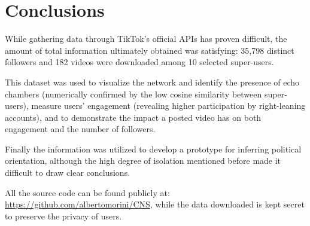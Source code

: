 \section{Conclusions}

While gathering data through TikTok's official APIs has proven difficult, the amount of total information ultimately obtained was satisfying: 35,798 distinct followers and 182 videos were downloaded among 10 selected super-users.

This dataset was used to visualize the network and identify the presence of echo chambers (numerically confirmed by the low cosine similarity between super-users), measure users' engagement (revealing higher participation by right-leaning accounts), and to demonstrate the impact a posted video has on both engagement and the number of followers.

Finally the information was utilized to develop a prototype for inferring political orientation, although the high degree of isolation mentioned before made it difficult to draw clear conclusions.

All the source code can be found publicly at: \url{https://github.com/albertomorini/CNS}, while the data downloaded is kept secret to preserve the privacy of users.
